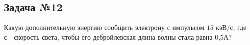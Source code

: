 \subsection{Задача №12}

Какую дополнительную энергию сообщить электрону с импульсом $15 \text{ кэВ/с}$, где с - скорость света, чтобы его дебройлевская длина волны стала равна 0,5А?

